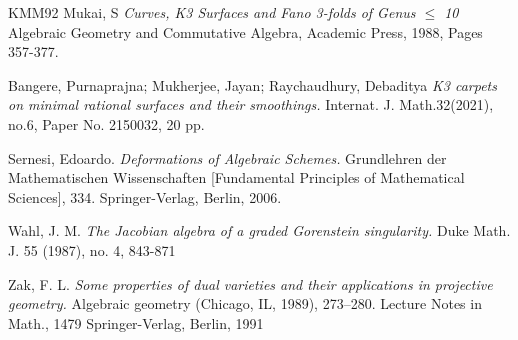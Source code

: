 \documentclass[11pt,twoside]{amsart}
\theoremstyle{plain}
\numberwithin{equation}{section}
\theoremstyle{definition}
\begin{document}
\begin{thebibliography}{KMM92}
Mukai, S
\emph{Curves, K3 Surfaces and Fano 3-folds of Genus $\leq$ 10}
Algebraic Geometry and Commutative Algebra, Academic Press,
1988, Pages 357-377.

  \color{black}
  


  \color{black}

Bangere, Purnaprajna; Mukherjee, Jayan; Raychaudhury, Debaditya
\emph{K3 carpets on minimal rational surfaces and their smoothings.}
Internat. J. Math.32(2021), no.6, Paper No. 2150032, 20 pp.






Sernesi, Edoardo.
\emph{Deformations of Algebraic Schemes.}
Grundlehren der Mathematischen Wissenschaften [Fundamental Principles of Mathematical Sciences], 334. Springer-Verlag, Berlin, 2006.













Wahl, J. M. 
\emph{The Jacobian algebra of a graded Gorenstein singularity.}
Duke Math. J. 55 (1987), no. 4,
843-871

Zak, F. L.
\emph{Some properties of dual varieties and their applications in projective geometry.}
Algebraic geometry (Chicago, IL, 1989), 273–280.
Lecture Notes in Math., 1479
Springer-Verlag, Berlin, 1991

 






  

\end{thebibliography}
\end{document}
